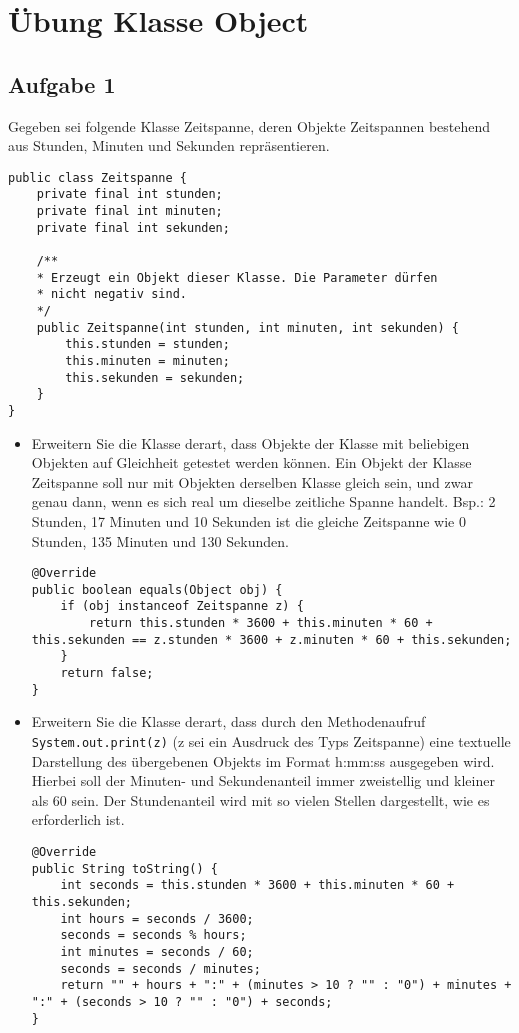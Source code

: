 \chapter{Übung Klasse Object}

\section{Aufgabe 1}
Gegeben sei folgende Klasse Zeitspanne, deren Objekte Zeitspannen bestehend aus
Stunden, Minuten und Sekunden repräsentieren.

\begin{lstlisting}
public class Zeitspanne {
    private final int stunden;
    private final int minuten;
    private final int sekunden;

    /**
    * Erzeugt ein Objekt dieser Klasse. Die Parameter dürfen
    * nicht negativ sind.
    */
    public Zeitspanne(int stunden, int minuten, int sekunden) {
        this.stunden = stunden;
        this.minuten = minuten;
        this.sekunden = sekunden;
    }
}
\end{lstlisting}

\begin{itemize}
    \item Erweitern Sie die Klasse derart, dass Objekte der Klasse mit beliebigen
          Objekten auf Gleichheit getestet werden können. Ein Objekt der Klasse
          Zeitspanne soll nur mit Objekten derselben Klasse gleich sein, und zwar genau
          dann, wenn es sich real um dieselbe zeitliche Spanne handelt. \newline Bsp.: 2
          Stunden, 17 Minuten und 10 Sekunden ist die gleiche Zeitspanne wie 0 Stunden,
          135 Minuten und 130 Sekunden. \newline
          \begin{lstlisting}
@Override
public boolean equals(Object obj) {
    if (obj instanceof Zeitspanne z) {
        return this.stunden * 3600 + this.minuten * 60 + this.sekunden == z.stunden * 3600 + z.minuten * 60 + this.sekunden;
    }
    return false;
}
\end{lstlisting}
    \item Erweitern Sie die Klasse derart, dass durch den Methodenaufruf
          \lstinline{System.out.print(z)} (z sei ein Ausdruck des Typs Zeitspanne) eine
          textuelle Darstellung des übergebenen Objekts im Format h:mm:ss ausgegeben
          wird. Hierbei soll der Minuten- und Sekundenanteil immer zweistellig und
          kleiner als 60 sein. Der Stundenanteil wird mit so vielen Stellen dargestellt,
          wie es erforderlich ist. \newline
          \begin{lstlisting}
@Override
public String toString() {
    int seconds = this.stunden * 3600 + this.minuten * 60 + this.sekunden;
    int hours = seconds / 3600;
    seconds = seconds % hours;
    int minutes = seconds / 60;
    seconds = seconds / minutes;
    return "" + hours + ":" + (minutes > 10 ? "" : "0") + minutes + ":" + (seconds > 10 ? "" : "0") + seconds;
}
\end{lstlisting}
\end{itemize}

